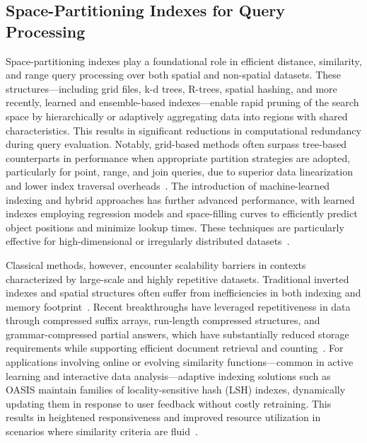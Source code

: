 \documentclass[sigconf]{acmart}
\begin{document}
\subsection{Space-Partitioning Indexes for Query Processing}

Space-partitioning indexes play a foundational role in efficient distance, similarity, and range query processing over both spatial and non-spatial datasets. These structures—including grid files, k-d trees, R-trees, spatial hashing, and more recently, learned and ensemble-based indexes—enable rapid pruning of the search space by hierarchically or adaptively aggregating data into regions with shared characteristics. This results in significant reductions in computational redundancy during query evaluation. Notably, grid-based methods often surpass tree-based counterparts in performance when appropriate partition strategies are adopted, particularly for point, range, and join queries, due to superior data linearization and lower index traversal overheads~\cite{ref31,ref35}. The introduction of machine-learned indexing and hybrid approaches has further advanced performance, with learned indexes employing regression models and space-filling curves to efficiently predict object positions and minimize lookup times. These techniques are particularly effective for high-dimensional or irregularly distributed datasets~\cite{ref35,ref51,ref54,ref111}.

Classical methods, however, encounter scalability barriers in contexts characterized by large-scale and highly repetitive datasets. Traditional inverted indexes and spatial structures often suffer from inefficiencies in both indexing and memory footprint~\cite{ref75,ref98}. Recent breakthroughs have leveraged repetitiveness in data through compressed suffix arrays, run-length compressed structures, and grammar-compressed partial answers, which have substantially reduced storage requirements while supporting efficient document retrieval and counting~\cite{ref73,ref91}. For applications involving online or evolving similarity functions—common in active learning and interactive data analysis—adaptive indexing solutions such as OASIS maintain families of locality-sensitive hash (LSH) indexes, dynamically updating them in response to user feedback without costly retraining. This results in heightened responsiveness and improved resource utilization in scenarios where similarity criteria are fluid~\cite{ref56,ref111}.
\end{document}
